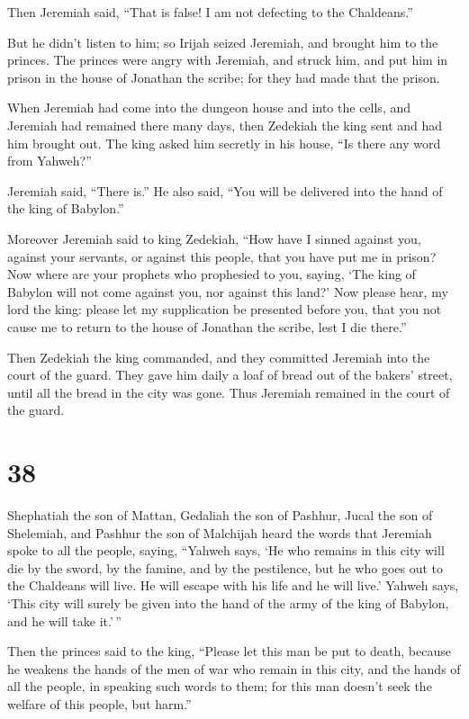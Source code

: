  Then Jeremiah said, ``That is false! I am not defecting
to the Chaldeans.''

But he didn't listen to him; so Irijah seized Jeremiah, and brought him
to the princes.  The princes were angry with Jeremiah,
and struck him, and put him in prison in the house of Jonathan the
scribe; for they had made that the prison.

 When Jeremiah had come into the dungeon house and into
the cells, and Jeremiah had remained there many days, 
then Zedekiah the king sent and had him brought out. The king asked him
secretly in his house, ``Is there any word from Yahweh?''

Jeremiah said, ``There is.'' He also said, ``You will be delivered into
the hand of the king of Babylon.''

 Moreover Jeremiah said to king Zedekiah, ``How have I
sinned against you, against your servants, or against this people, that
you have put me in prison?  Now where are your prophets
who prophesied to you, saying, `The king of Babylon will not come
against you, nor against this land?'  Now please hear, my
lord the king: please let my supplication be presented before you, that
you not cause me to return to the house of Jonathan the scribe, lest I
die there.''

 Then Zedekiah the king commanded, and they committed
Jeremiah into the court of the guard. They gave him daily a loaf of
bread out of the bakers' street, until all the bread in the city was
gone. Thus Jeremiah remained in the court of the guard.

\hypertarget{section-37}{%
\section{38}\label{section-37}}

 Shephatiah the son of Mattan, Gedaliah the son of
Pashhur, Jucal the son of Shelemiah, and Pashhur the son of Malchijah
heard the words that Jeremiah spoke to all the people, saying,
 ``Yahweh says, `He who remains in this city will die by
the sword, by the famine, and by the pestilence, but he who goes out to
the Chaldeans will live. He will escape with his life and he will live.'
 Yahweh says, `This city will surely be given into the
hand of the army of the king of Babylon, and he will take it.'\,''

 Then the princes said to the king, ``Please let this man
be put to death, because he weakens the hands of the men of war who
remain in this city, and the hands of all the people, in speaking such
words to them; for this man doesn't seek the welfare of this people, but
harm.''

